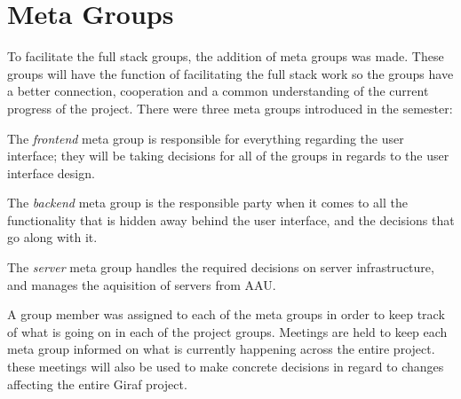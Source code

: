 \section{Meta Groups}\label{SEC:MetaGroups}
To facilitate the full stack groups, the addition of meta groups was made.
These groups will have the function of facilitating the full stack work so the groups have a better connection, cooperation and a common understanding of the current progress of the project.
There were three meta groups introduced in the semester:

The \textit{frontend} meta group is responsible for everything regarding the user interface; they will be taking decisions for all of the groups in regards to the user interface design.

The \textit{backend} meta group is the responsible party when it comes to all the functionality that is hidden away behind the user interface, and the decisions that go along with it.

The \textit{server} meta group handles the required decisions on server infrastructure, and manages the aquisition of servers from AAU.

A group member was assigned to each of the meta groups in order to keep track of what is going on in each of the project groups. 
Meetings are held to keep each meta group informed on what is currently happening across the entire project. 
these meetings will also be used to make concrete decisions in regard to changes affecting the entire Giraf project.
